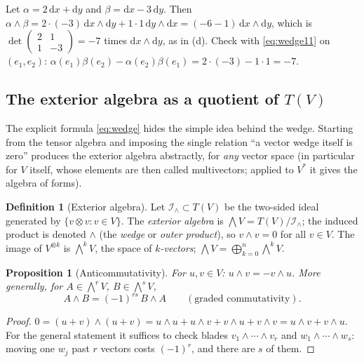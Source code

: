 \documentclass[11pt,a4paper]{article}
\newcounter{thm}[section]
\numberwithin{equation}{section}
\theoremstyle{definition}
\newtheorem{definition}[thm]{Definition}
\theoremstyle{plain}
\newtheorem{proposition}[thm]{Proposition}
\newcommand{\dd}{\mathrm{d}}
\begin{document}
\begin{example}\label{ex:wedge2}
Let $\alpha=2\,\dd x+\dd y$ and $\beta=\dd x-3\,\dd y$. Then $\alpha\wedge\beta=2\cdot(-3)\,\dd x\wedge\dd y+1\cdot1\,\dd y\wedge\dd x
=(-6-1)\,\dd x\wedge\dd y$, which is $\det\begin{pmatrix}2&1\\1&-3\end{pmatrix}=-7$ times $\dd x\wedge\dd y$, as in (d). Check with
\eqref{eq:wedge11} on $(e_1,e_2)$: $\alpha(e_1)\beta(e_2)-\alpha(e_2)\beta(e_1)=2\cdot(-3)-1\cdot1=-7$.
\end{example}

\subsection{The exterior algebra as a quotient of $T(V)$}\label{sec:extquotient}

The explicit formula \eqref{eq:wedge} hides the simple idea behind the wedge. Starting from the tensor algebra and imposing the
single relation ``a vector wedge itself is zero'' produces the exterior algebra abstractly, for \emph{any} vector space
(in particular for $V$ itself, whose elements are then called multivectors; applied to $V^*$ it gives the algebra of forms).
\begin{definition}[Exterior algebra]
Let $\mathcal I_\wedge\subset T(V)$ be the two-sided ideal generated by $\{v\otimes v: v\in V\}$.
The \emph{exterior algebra} is $\bigwedge V=T(V)/\mathcal I_\wedge$; the induced product is denoted $\wedge$
(the \emph{wedge} or \emph{outer product}), so $v\wedge v=0$ for all $v\in V$. The image of $V^{\otimes k}$ is
$\bigwedge^kV$, the space of \emph{$k$-vectors}; $\bigwedge V=\bigoplus_{k=0}^n\bigwedge^kV$.
\end{definition}

\begin{proposition}[Anticommutativity]\label{prop:anti}
For $u,v\in V$: $u\wedge v=-v\wedge u$. More generally, for $A\in\bigwedge^rV$, $B\in\bigwedge^sV$,
\[
 A\wedge B=(-1)^{rs}\,B\wedge A\qquad(\text{graded commutativity}).
\]
\end{proposition}
\begin{proof}
$0=(u+v)\wedge(u+v)=u\wedge u+u\wedge v+v\wedge u+v\wedge v=u\wedge v+v\wedge u$. For the general statement it suffices
to check blades $v_1\wedge\cdots\wedge v_r$ and $w_1\wedge\cdots\wedge w_s$: moving one $w_j$ past $r$ vectors costs $(-1)^r$,
and there are $s$ of them.
\end{proof}
\end{document}
